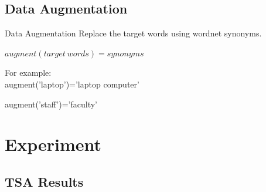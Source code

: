 \documentclass[xcolor=dvipsnames]{beamer}
\begin{document}
\subsection{Data Augmentation}
\begin{frame}{Data Augmentation}
Replace the target words using wordnet synonyms.

$augment(target \ words)=synonyms$


For example: \\

augment('laptop')='laptop computer'


augment('staff')='faculty'
\end{frame}


\section{Experiment}
\subsection{TSA Results}
\end{document}
